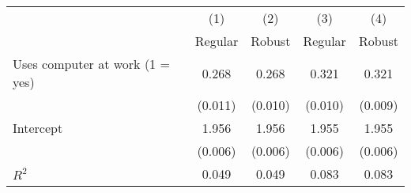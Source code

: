 \begin{tabular}{l*{4}{c}}
\hline\hline
            &\multicolumn{1}{c}{(1)}&\multicolumn{1}{c}{(2)}&\multicolumn{1}{c}{(3)}&\multicolumn{1}{c}{(4)}\\
            &\multicolumn{1}{c}{Regular}&\multicolumn{1}{c}{Robust}&\multicolumn{1}{c}{Regular}&\multicolumn{1}{c}{Robust}\\
\hline
Uses computer at work (1 = yes)&       0.268&       0.268&       0.321&       0.321\\
            &     (0.011)&     (0.010)&     (0.010)&     (0.009)\\
Intercept   &       1.956&       1.956&       1.955&       1.955\\
            &     (0.006)&     (0.006)&     (0.006)&     (0.006)\\
\hline
\(R^{2}\)   &       0.049&       0.049&       0.083&       0.083\\
\hline\hline
\end{tabular}
